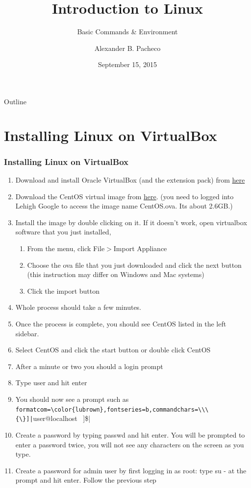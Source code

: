 \documentclass[10pt,t]{beamer}
\title{Introduction to Linux}
\subtitle{Basic Commands \& Environment}
\author{Alexander B. Pacheco}
\institute{\href{http://researchcomputing.lehigh.edu}{LTS Research Computing}}%
\date{September 15, 2015}
\begin{document}
\begin{frame}[c]
  \titlepage
\end{frame}

\footnotesize
\begin{frame}{Outline}
  \tableofcontents
\end{frame}

\section*{Installing Linux on VirtualBox}
\begin{frame}[fragile]
  \frametitle{Installing Linux on VirtualBox}
  \begin{enumerate}
    \item Download and install Oracle VirtualBox (and the extension pack) from \href{https://www.virtualbox.org/wiki/Downloads}{here}
    \item Download the CentOS virtual image from \href{https://drive.google.com/open?id=0ByziB2zqYhHVcHRKTWZqdFZUX0E&authuser=1}{here}. (you need to logged into Lehigh Google to access the image name CentOS.ova. Its about 2.6GB.)
    \item Install the image by double clicking on it. If it doesn't work, open virtualbox software that you just installed, 
    \begin{enumerate}
      \item From the menu, click File$>$Import Appliance
      \item Choose the ova file that you just downloaded and click the next button (this instruction may differ on Windows and Mac systems)
      \item Click the import button
    \end{enumerate}	
    \item Whole process should take a few minutes.
    \item Once the process is complete, you should see CentOS listed in the left sidebar.
    \item Select CentOS and click the start button or double click CentOS
    \item After a minute or two you should a login prompt
    \item Type user and hit enter
    \item You should now see a prompt such as \Verb[formatcom=\color{lubrown},fontseries=b,commandchars=\\\{\}]|[user@localhost ~]\$|
    \item Create a password by typing passwd and hit enter. You will be prompted to enter a password twice, you will not see any characters on the screen as you type.
    \item Create a password for admin user by first logging in as root: type su - at the prompt and hit enter. Follow the previous step
  \end{enumerate}
\end{frame}
\end{document}

